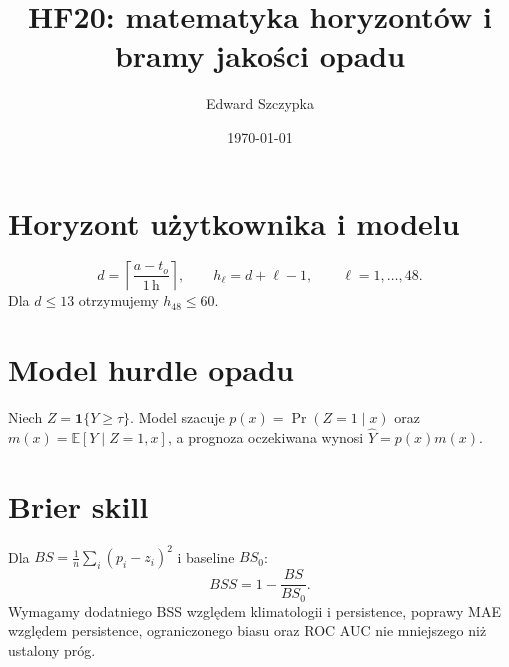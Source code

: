 \documentclass[11pt,a4paper]{article}
\title{HF20: matematyka horyzontów i bramy jakości opadu}
\author{Edward Szczypka}
\date{\today}
\begin{document}
\maketitle
\section{Horyzont użytkownika i modelu}
\[
 d=\left\lceil\frac{a-t_o}{1\,\mathrm{h}}\right\rceil,
 \qquad h_\ell=d+\ell-1,
 \qquad \ell=1,\ldots,48.
\]
Dla $d\leq 13$ otrzymujemy $h_{48}\leq 60$.
\section{Model hurdle opadu}
Niech $Z=\mathbf{1}\{Y\geq\tau\}$. Model szacuje
$p(x)=\Pr(Z=1\mid x)$ oraz $m(x)=\mathbb{E}[Y\mid Z=1,x]$, a prognoza
oczekiwana wynosi $\widehat Y=p(x)m(x)$.
\section{Brier skill}
Dla $BS=\frac1n\sum_i(p_i-z_i)^2$ i baseline $BS_0$:
\[
 BSS=1-\frac{BS}{BS_0}.
\]
Wymagamy dodatniego BSS względem klimatologii i persistence, poprawy MAE
względem persistence, ograniczonego biasu oraz ROC AUC nie mniejszego niż
ustalony próg.
\end{document}
